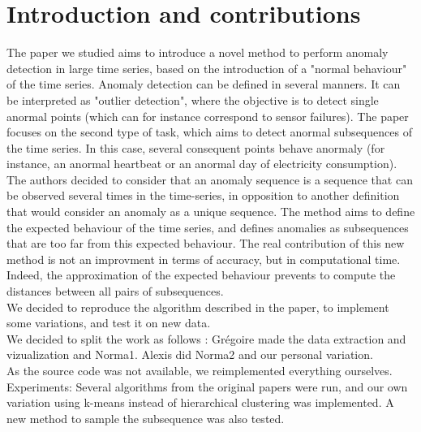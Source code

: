 \documentclass[11pt]{article}
\begin{document}
\section{Introduction and contributions}
The paper we studied aims to introduce a novel method to perform anomaly detection in large time series, based on the introduction of a "normal behaviour" of the time series.
Anomaly detection can be defined in several manners. 
It can be interpreted as "outlier detection", where the objective is to detect single anormal points (which can for instance correspond to sensor failures). 
The paper focuses on the second type of task, which aims to detect anormal subsequences of the time series. 
In this case, several consequent points behave anormaly (for instance, an anormal heartbeat or an anormal day of electricity consumption).
The authors decided to consider that an anomaly sequence is a sequence that can be observed several times in the time-series, in opposition to another definition that would consider an anomaly as a unique sequence.
The method aims to define the expected behaviour of the time series, and defines anomalies as subsequences that are too far from this expected behaviour.
The real contribution of this new method is not an improvment in terms of accuracy, but in computational time. 
Indeed, the approximation of the expected behaviour prevents to compute the distances between all pairs of subsequences. \\[0.5cm]
We decided to reproduce the algorithm described in the paper, to implement some variations, and test it on new data. \\[0.5cm]
We decided to split the work as follows : Grégoire made the data extraction and vizualization and Norma1. Alexis did Norma2 and our personal variation. \\[0.5cm]
As the source code was not available, we reimplemented everything ourselves. \\[0.5cm]
Experiments: Several algorithms from the original papers were run, and our own variation using k-means instead of hierarchical clustering was implemented. 
A new method to sample the subsequence was also tested. \\[0.5cm]
\end{document}

